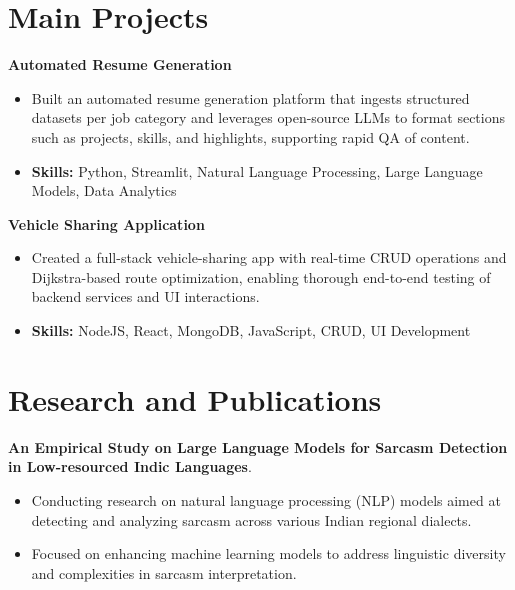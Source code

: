 \documentclass[a4paper,11pt]{article}
\begin{document}
\section{\textbf{Main Projects}}

\vspace{1mm}
  \textbf{Automated Resume Generation  }
\vspace{-1.5mm} %
\begin{itemize}
  \item Built an automated resume generation platform that ingests structured datasets per job category and leverages open-source LLMs to format sections such as projects, skills, and highlights, supporting rapid QA of content.
\vspace{-3mm}
  \item \textbf{Skills:} Python, Streamlit, Natural Language Processing, Large Language Models, Data Analytics
\end{itemize}


\vspace{1mm}
   \textbf{Vehicle Sharing Application }
\vspace{-1.5mm} %
\begin{itemize}
  \item Created a full-stack vehicle-sharing app with real-time CRUD operations and Dijkstra-based route optimization, enabling thorough end-to-end testing of backend services and UI interactions.
\vspace{-3mm}
  \item \textbf{Skills:} NodeJS, React, MongoDB, JavaScript, CRUD, UI Development
\end{itemize}



\section{\textbf{Research and Publications} \hfill }
\vspace{1mm}
  \textbf{An Empirical Study on Large Language Models for Sarcasm Detection in Low-resourced Indic Languages}.
\vspace{-1mm} %
\begin{itemize}
  \item Conducting research on natural language processing (NLP) models aimed at detecting and analyzing sarcasm across various Indian regional dialects.
\vspace{-3mm}
  \item Focused on enhancing machine learning models to address linguistic diversity and complexities in sarcasm interpretation.
\end{itemize}
\end{document}
